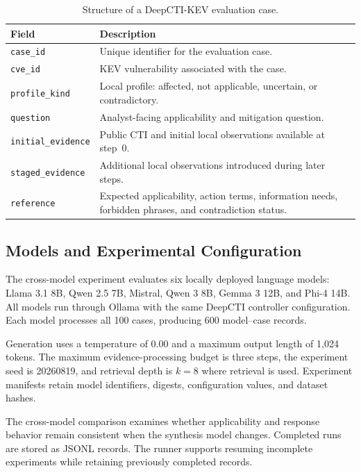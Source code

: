 \documentclass[conference]{IEEEtran}
\begin{document}
\begin{table}[!t]
\caption{Structure of a DeepCTI-KEV evaluation case.}
\label{tab:deepcti-dataset-schema}
\centering
\scriptsize
\setlength{\tabcolsep}{3.2pt}
\renewcommand{\arraystretch}{1.08}
\begin{tabularx}{\columnwidth}{
    >{\raggedright\arraybackslash}p{}
    >{\raggedright\arraybackslash}X
}
\toprule
\textbf{Field} & \textbf{Description} \\
\midrule
\texttt{case\_id}
& Unique identifier for the evaluation case. \\
\texttt{cve\_id}
& KEV vulnerability associated with the case. \\
\texttt{profile\_kind}
& Local profile: affected, not applicable, uncertain, or contradictory. \\
\texttt{question}
& Analyst-facing applicability and mitigation question. \\
\texttt{initial\_evidence}
& Public CTI and initial local observations available at step~0. \\
\texttt{staged\_evidence}
& Additional local observations introduced during later steps. \\
\texttt{reference}
& Expected applicability, action terms, information needs, forbidden phrases, and contradiction status. \\
\bottomrule
\end{tabularx}
\end{table}

\subsection{Models and Experimental Configuration}

The cross-model experiment evaluates six locally deployed language
models: Llama 3.1 8B, Qwen 2.5 7B, Mistral, Qwen 3 8B, Gemma 3 12B,
and Phi-4 14B. All models run through Ollama with the same DeepCTI
controller configuration. Each model processes all 100 cases, producing
600 model--case records.

Generation uses a temperature of 0.00 and a maximum output length of
1,024 tokens. The maximum evidence-processing budget is three steps,
the experiment seed is 20260819, and retrieval depth is $k=8$ where
retrieval is used. Experiment manifests retain model identifiers,
digests, configuration values, and dataset hashes.

The cross-model comparison examines whether applicability and response
behavior remain consistent when the synthesis model changes. Completed
runs are stored as JSONL records. The runner supports resuming
incomplete experiments while retaining previously completed records.
\end{document}
